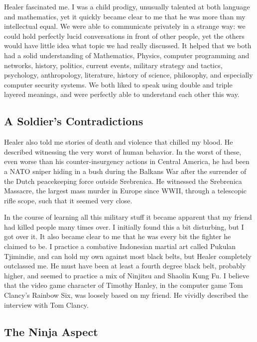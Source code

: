 Healer fascinated me.  I was a child prodigy, unusually talented at both language and mathematics, yet it quickly became clear to me that he was more than my intellectual equal.  We were able to communicate privately in a strange way:  we could hold perfectly lucid conversations in front of other people, yet the others would have little idea what topic we had really discussed.   It helped that we both had a solid understanding of Mathematics, Physics, computer programming and networks, history, politics, current events, military strategy and tactics, psychology, anthropology, literature, history of science, philosophy, and especially computer security systems.   We both liked to speak using double and triple layered meanings, and were perfectly able to understand each other this way.

\subsection*{A Soldier's Contradictions}
\label{pos03:a-soldiers-contradictions}

Healer also told me stories of death and violence that chilled my blood.  He described witnessing the very worst of human behavior.  In the worst of these, even worse than his counter-insurgency actions in Central America, he had been a NATO sniper hiding in a bush during the Balkans War after the surrender of the Dutch peacekeeping force outside Srebrenica.  He witnessed the Srebrenica Massacre, the largest mass murder in Europe since WWII, through a telescopic rifle scope, such that it seemed very close.

In the course of learning all this military stuff it became apparent that my friend had killed people many times over.  I initially found this a bit disturbing, but I got over it.  It also became clear to me that he was every bit the fighter he claimed to be.  I practice a combative Indonesian martial art called Pukulan Tjimindie, and can hold my own against most black belts, but Healer completely outclassed me.  He must have been at least a fourth degree black belt, probably higher, and seemed to practice a mix of Ninjitsu and Shaolin Kung Fu.  I believe that the video game character of Timothy Hanley, in the computer game Tom Clancy's Rainbow Six, was loosely based on my friend.  He vividly described the interview with Tom Clancy.

\subsection*{The Ninja Aspect}
\label{pos03:the-ninja-aspect}

